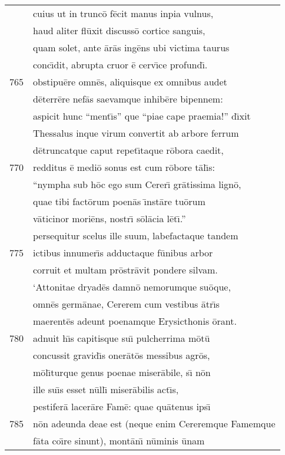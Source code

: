 \documentclass[paper=6in:9in,pagesize=pdftex,
               headinclude=on,footinclude=on,12pt]{scrbook}
\begin{document}
\begin{longtable}[p]{ r l }
 & cuius ut in trunc\=o f\=ecit manus inpia vulnus,\\ 
 & haud aliter fl\=uxit discuss\=o cortice sanguis,\\ 
 & quam solet, ante \=ar\=as ing\=ens ubi victima taurus\\ 
 & conc\={\i}dit, abrupta cruor \=e cerv\={\i}ce profund\={\i}.\\ 
765 & obstipu\=ere omn\=es, aliquisque ex omnibus audet\\ 
 & d\=eterr\=ere nef\=as saevamque inhib\=ere bipennem:\\ 
 & aspicit hunc ``ment\={\i}s'' que ``piae cape praemia!'' d\={\i}xit\\ 
 & Thessalus inque virum convertit ab arbore ferrum\\ 
 & d\=etruncatque caput repet\={\i}taque r\=obora caedit,\\ 
770 & redditus \=e medi\=o sonus est cum r\=obore t\=al\={\i}s:\\ 
 & ``nympha sub h\=oc ego sum Cerer\={\i} gr\=atissima lign\=o,\\ 
 & quae tibi fact\=orum poen\=as \={\i}nst\=are tu\=orum\\ 
 & v\=aticinor mori\=ens, nostr\={\i} s\=ol\=acia l\=et\={\i}.''\\ 
 & persequitur scelus ille suum, labefactaque tandem\\ 
775 & ictibus innumer\={\i}s adductaque f\=unibus arbor\\ 
 & corruit et multam pr\=ostr\=avit pondere silvam.\\ 
 & \indent `Attonitae dryad\=es damn\=o nemorumque su\=oque,\\ 
 & omn\=es germ\=anae, Cererem cum vestibus \=atr\={\i}s\\ 
 & maerent\=es adeunt poenamque Erysicthonis \=orant.\\ 
780 & adnuit h\={\i}s capitisque su\={\i} pulcherrima m\=ot\=u\\ 
 & concussit gravid\={\i}s oner\=at\=os messibus agr\=os,\\ 
 & m\=ol\={\i}turque genus poenae miser\=abile, s\={\i} n\=on\\ 
 & ille su\={\i}s esset n\=ull\={\i} miser\=abilis act\={\i}s,\\ 
 & pestifer\=a lacer\=are Fam\=e: quae qu\=atenus ips\={\i}\\ 
785 & n\=on adeunda deae est (neque enim Cereremque Famemque\\ 
 & f\=ata co\={\i}re sinunt), mont\=an\={\i} n\=uminis \=unam\\ 

\end{longtable}
\end{document}
